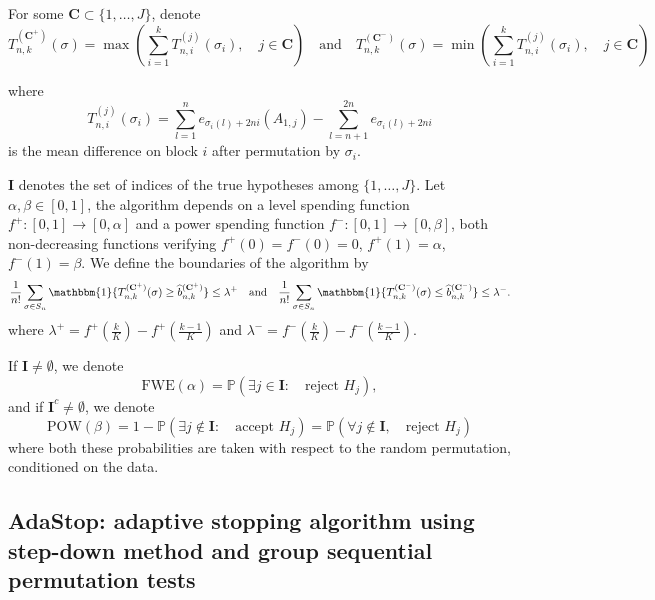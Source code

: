 \documentclass{article}
\theoremstyle{plain}
\theoremstyle{remark}
\renewcommand{\P}{\mathbb{P}}
\newcommand{\1}{\mathbbm{1}}
\numberwithin{equation}{section}
\begin{document}
For some $\textbf{C} \subset \{1,\dots,J\}$, denote
$$T_{n,k}^{(\textbf{C}^+)}(\sigma)= \max\left(\sum_{i=1}^kT_{n,i}^{(j)}(\sigma_i),\quad j \in \textbf{C}\right) \quad \text{and}\quad T_{n,k}^{(\textbf{C}^-)}(\sigma)= \min\left(\sum_{i=1}^kT_{n,i}^{(j)}(\sigma_i),\quad j \in \textbf{C}\right)$$

where 
$$T_{n,i}^{(j)}(\sigma_i)= \sum_{l=1}^{n} e_{\sigma_i(l)+2ni}(A_{1,j})-\sum_{l=n+1}^{2n} e_{\sigma_i(l)+2ni} $$
is the mean difference on block $i$ after permutation by $\sigma_i$.
 
$\textbf{I}$ denotes the set of indices of the true hypotheses among $\{1,\dots,J\}$. Let $\alpha, \beta \in [0,1]$, the algorithm depends on a level spending function $f^+:[0,1]\to[0,\alpha]$ and a power spending function $f^-:[0,1]\to [0,\beta]$, both non-decreasing functions verifying $f^+(0)=f^-(0)=0$, $f^+(1)=\alpha$, $f^-(1)=\beta$. We define the boundaries of the algorithm by 
$$\frac{1}{n!}\sum_{\sigma \in S_n} \1\{T_{n,k}^{(\textbf{C}^+)}(\sigma) \ge  \widehat{b}_{n,k}^{(\textbf{C}^+)}\} \le  \lambda^+ \quad \text{and}\quad \frac{1}{n!}\sum_{\sigma \in S_n} \1\{T_{n,k}^{(\textbf{C}^-)}(\sigma) \leq   \widehat{b}_{n,k}^{(\textbf{C}^-)}\} \le  \lambda^- .$$
where $\lambda^+ = f^+ \left(\frac{k}{K}\right)- f^+ \left( \frac{k-1}{K}\right)$ and $\lambda^- = f^- \left(\frac{k}{K}\right)- f^- \left( \frac{k-1}{K}\right)$.

If $\textbf{I} \neq \emptyset$, we denote 
$$\mathrm{FWE}(\alpha) = \P\left(\exists j \in \textbf{I}:\quad  \text{reject }H_j \right),$$
and if $\textbf{I}^c \neq \emptyset$, we denote 
$$\mathrm{POW}(\beta) =  1-\P\left(\exists j \notin \textbf{I}:\quad  \text{accept }H_j \right)= \P\left(\forall j \notin \textbf{I}, \quad \text{reject }H_j\right) $$
where both these probabilities are taken with respect to the random permutation, conditioned on the data.
\subsection{AdaStop: adaptive stopping algorithm using step-down method and group sequential permutation tests}
\end{document}
